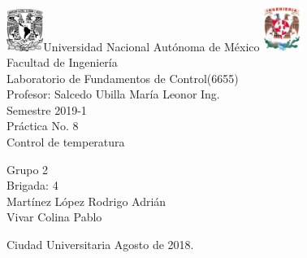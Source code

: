 

\begin{titlepage}
     \begin{center}
	\includegraphics[width=0.09\textwidth]{UNAM}\Large Universidad Nacional Autónoma de México
        	\includegraphics[width=0.09\textwidth]{FI}\\[1cm]
        \Large Facultad de Ingeniería\\[1cm]
         \Large Laboratorio de Fundamentos de Control(6655)\\[1cm]
         \footnotesize Profesor: Salcedo Ubilla María Leonor Ing.\\[1cm]
        \footnotesize Semestre 2019-1\\[1cm]
        
       

        \Large Práctica No. 8\\[1cm]
        
           

\Large Control de temperatura
        
          \begin{flushright}
\footnotesize  Grupo 2\\[0.5cm]
\footnotesize Brigada: 4\\[0.5cm]
\footnotesize Martínez López Rodrigo Adrián\\[0.5cm]
\footnotesize Vivar Colina Pablo\\[0.5cm]
 \end{flushright}
          \begin{flushleft}
        \footnotesize Ciudad Universitaria Agosto de 2018.\\
          \end{flushleft}
         
          
   \end{center}
\end{titlepage}
